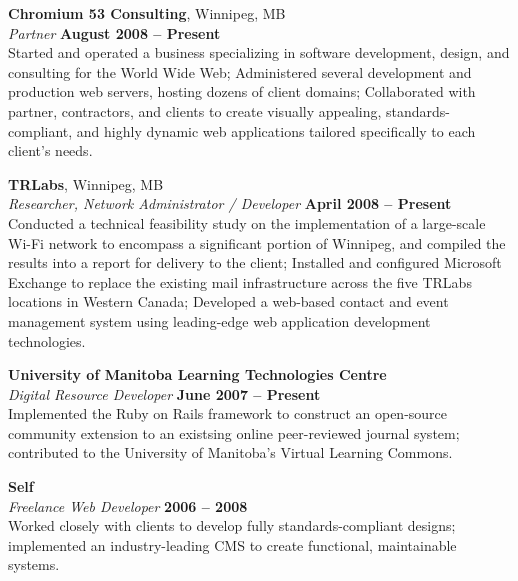 \documentclass[margin,line,letterpaper]{resume}
\begin{document}
\begin{resume}
  {\bf Chromium 53 Consulting}, Winnipeg, MB \vspace{2mm}\\\vspace{1mm}%
  {\sl Partner} \hfill {\bf August 2008 -- Present}\\
  Started and operated a business specializing in software development, design, and
  consulting for the World Wide Web; Administered several development and production web servers,
  hosting dozens of client domains; Collaborated with partner, contractors, and clients to create
  visually appealing, standards-compliant, and highly dynamic web applications tailored specifically
  to each client's needs.

  {\bf TRLabs}, Winnipeg, MB \vspace{2mm}\\\vspace{1mm}%
  {\sl Researcher, Network Administrator / Developer} \hfill {\bf April 2008 -- Present}\\
  Conducted a technical feasibility study on the implementation of a large-scale Wi-Fi
  network to encompass a significant portion of Winnipeg, and compiled the results into a report
  for delivery to the client; Installed and configured Microsoft Exchange to replace the
  existing mail infrastructure across the five TRLabs locations in Western Canada;
  Developed a web-based contact and event management system using leading-edge web application 
  development technologies.

  {\bf University of Manitoba Learning Technologies Centre} \vspace{2mm}\\\vspace{1mm}%
  {\sl Digital Resource Developer} \hfill {\bf June 2007 -- Present}\\
  Implemented the Ruby on Rails framework to construct an open-source
  community extension to an existsing online peer-reviewed journal system; contributed to the
  University of Manitoba's Virtual Learning Commons.

  {\bf Self} \vspace{2mm}\\\vspace{1mm}%
  {\sl Freelance Web Developer} \hfill {\bf 2006 -- 2008}\\
  Worked closely with clients to develop fully standards-compliant designs; implemented
  an industry-leading CMS to create functional, maintainable systems.


\end{resume}
\end{document}
